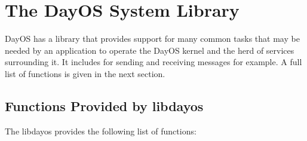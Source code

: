 \chapter{The DayOS System Library}
DayOS has a library that provides support for many common tasks that may be needed
by an application to operate the DayOS kernel and the herd of services surrounding it.
It includes for sending and receiving messages for example. A full list of functions
is given in the next section.

\section{Functions Provided by libdayos}
The libdayos provides the following list of functions:
\begin{verbatim}

\end{verbatim}